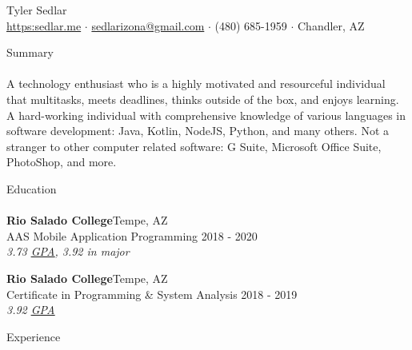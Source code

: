 \documentclass[a4paper]{article}
\newcommand{\lineunder} {
    \vspace*{-8pt} \\
    \hspace*{-18pt} \hrulefill \\
}
\newcommand{\header} [1] {
    {\hspace*{-18pt}\vspace*{6pt} {#1}}
    \vspace*{-6pt} \lineunder
}
\newcommand{\textslash}{/}
\begin{document}
\vspace*{-40pt}
\setul{}{0.25pt}

\vspace*{-10pt}
\begin{center}
	{\Huge {Tyler Sedlar}}\\
	\href{https://sedlar.me/}{https:\raisebox{1.1pt}{\textsc{\textbf{\textslash \textslash}}}sedlar.me} $\cdot$ \href{mailto:sedlarizona@gmail.com}{sedlarizona@gmail.com} $\cdot$ (480) 685-1959 $\cdot$ Chandler, AZ\\
\end{center}

\header{Summary}
A technology enthusiast who is a highly motivated and resourceful individual that multitasks, meets deadlines, thinks outside of the box, and enjoys learning.
A hard-working individual with comprehensive knowledge of various languages in software development: Java, Kotlin, NodeJS, Python, and many others.
Not a stranger to other computer related software: G Suite, Microsoft Office Suite, PhotoShop, and more.
\vspace{2mm}

\header{Education}
\textbf{Rio Salado College}\hfill Tempe, AZ\\
AAS Mobile Application Programming \hfill 2018 - 2020\\
\textit{3.73 \href{https://docs.google.com/spreadsheets/d/143DmVdsyjRVbH1ftcySxflvuNjioncAvJpj0vFbzpA8/edit?usp=sharing}{\ul{GPA}}, 3.92 in major}\\

\vspace{2mm}

\textbf{Rio Salado College}\hfill Tempe, AZ\\
Certificate in Programming \& System Analysis \hfill 2018 - 2019\\
\textit{3.92 \href{https://docs.google.com/spreadsheets/d/143DmVdsyjRVbH1ftcySxflvuNjioncAvJpj0vFbzpA8/edit?usp=sharing}{\ul{GPA}}}\\
\vspace{2mm}

\header{Experience}
\vspace{1mm}
\end{document}
